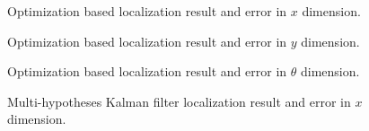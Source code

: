 \begin{figure}[!htbp]
  \centering
    \begin{subfigure}[b]{0.9\textwidth}
      
    \end{subfigure}
    \begin{subfigure}[b]{0.9\textwidth}
      
    \end{subfigure}
  \caption{Optimization based localization result and error in $x$ dimension. }
 \label{fig:benchmarkRprop0}
\end{figure}

\begin{figure}[!htbp]
  \centering
    \begin{subfigure}[b]{0.9\textwidth}
      
    \end{subfigure}
    \begin{subfigure}[b]{0.9\textwidth}
      
    \end{subfigure}
  \caption{Optimization based localization result and error in $y$ dimension.}
 \label{fig:benchmarkRprop1}
\end{figure}

\begin{figure}[!htbp]
  \centering
    \begin{subfigure}[b]{0.9\textwidth}
      
    \end{subfigure}
    \begin{subfigure}[b]{0.9\textwidth}
      
    \end{subfigure}
  \caption{Optimization based localization result and error in $\theta$ dimension.}
 \label{fig:benchmarkRprop2}
\end{figure}

\begin{figure}[!htbp]
  \centering
    \begin{subfigure}[b]{0.9\textwidth}
      
    \end{subfigure}
    \begin{subfigure}[b]{0.9\textwidth}
      
    \end{subfigure}
  \caption{Multi-hypotheses Kalman filter localization result and error  in $x$ dimension.}
 \label{fig:benchmarkKalman0}
\end{figure}

